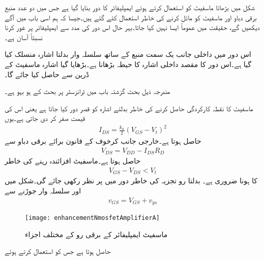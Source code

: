 شکل   میں بڑھاتا ماسفیٹ کو استعمال کرتے ہوئے ایمپلیفائر کا دور بنایا گیا ہے جس میں دو عدد منبع برقی دباو   اور  ماسفیٹ کو مائل کرنے کی خاطر استعمال کئے گئے ہیں۔جیسا کہ ہم اسی باب میں آگے دیکھیں گے، حقیقت میں عموماً ایسا نہیں کیا جاتا۔بہر حال اس دور کی مدد سے ایمپلیفائر پر غور کرنا نسبتاً آسان ہے۔

اس دور میں داخلی جانب یک سمت منبع  کے ساتھ سلسلہ وار بدلتا اشارہ  منسلک کیا گیا ہے۔اس دور کا مقصد داخلی اشارہ  کا حیطہ بڑھانا ہے۔بڑھایا گیا اشارہ ماسفیٹ کے ڈرین سے حاصل کیا جائے گا۔

مندرجہ ذیل بحث گزشتہ باب میں ٹرانزسٹر پر بحث کے ہو بہو ہے۔

 ماسفیٹ کا نقطہ کارکردگی حاصل کرنے کی خاطر بدلتے اشارہ کو قصر دور کیا جاتا ہے یعنی اس کی قیمت صفر کر دی جاتی ہے۔یوں
\begin{align} \label{مساوات_میدانی_یکسمتی_رو}
I_{DS}=\frac{k_n}{2} \left(V_{GS}-V_t \right )^2
\end{align}
حاصل ہوتا ہے۔خارجی جانب کرخوف کے قانون برائے برقی دباو سے
\begin{align} \label{مساوات_میدانی_یکسمتی_خارجی_دباو}
V_{DS}=V_{DD}-I_{DS}R_D
\end{align}
حاصل ہوتا ہے۔ماسفیٹ افزائندہ رہنے کی خاطر
\begin{align*}
V_{GS}-V_{DS}<V_t
\end{align*}
کا ہونا ضروری ہے۔
بدلتا رو تجزیہ کی خاطر دور میں  پر نظر رکھی جائے گی۔شکل   میں   اور  سلسلہ وار جوڑنے سے
\begin{align}
v_{GS}=V_{GS}+v_{gs}
\end{align}
%
\begin{figure}
\centering
\texttt{[image: enhancementNmosfetAmplifierA]}
\caption{ماسفیٹ ایمپلیفائر کے برقی رو کے مختلف اجزاء}
\label{شکل_ماسفیٹ_ایمپلیفائر_الف}
\end{figure}
حاصل ہوتا ہے جس کو استعمال کرتے ہوئے


